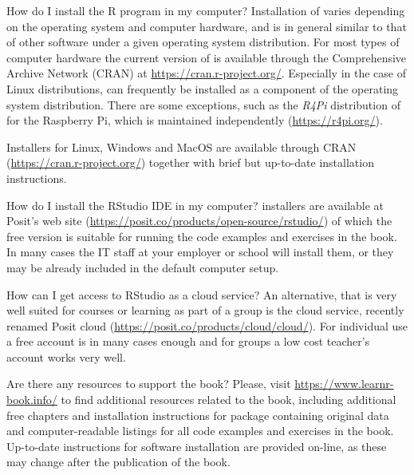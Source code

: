 \documentclass[krantz2]{krantz}\usepackage{knitr}
\begin{document}
\begin{faqbox}{How do I install the \textsf{R} program in my computer?}
Installation of \Rpgrm varies depending on the operating system and computer hardware, and is in general similar to that of other software under a given operating system distribution. For most types of computer hardware the current version of \Rpgrm is available through the Comprehensive \Rlang Archive Network (CRAN) at \url{https://cran.r-project.org/}. Especially in the case of Linux distributions, \Rpgrm can frequently be installed as a component of the operating system distribution. There are some exceptions, such as the \textsl{R4Pi} distribution of \Rpgrm for the Raspberry Pi, which is maintained independently (\url{https://r4pi.org/}).

Installers for Linux, Windows and MacOS are available through CRAN (\url{https://cran.r-project.org/}) together with brief but up-to-date installation instructions.
\end{faqbox}

\begin{faqbox}{How do I install the \textsf{RStudio} IDE in my computer?}
\RStudio installers are available at Posit's web site (\url{https://posit.co/products/open-source/rstudio/}) of which the free version is suitable for running the code examples and exercises in the book. In many cases the IT staff at your employer or school will install them, or they may be already included in the default computer setup.
\end{faqbox}

\begin{faqbox}{How can I get access to \textsf{RStudio} as a cloud service?}
An alternative, that is very well suited for courses or learning as part of a group is the \RStudio cloud service, recently renamed Posit cloud (\url{https://posit.co/products/cloud/cloud/}). For individual use a free account is in many cases enough and for groups a low cost teacher's account works very well.
\end{faqbox}

\begin{faqbox}{Are there any resources to support the book?}
Please, visit \url{https://www.learnr-book.info/} to find additional resources related to the book, including additional free chapters and installation instructions for package  containing original data and computer-readable listings for all code examples and exercises in the book. Up-to-date instructions for software installation are provided on-line, as these may change after the publication of the book.
\end{faqbox}
\end{document}
